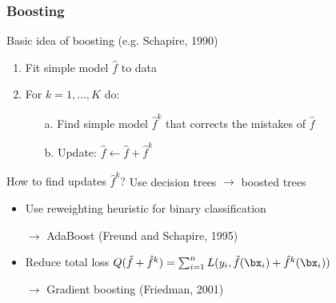\begin{frame}
	\frametitle{Boosting}
	\begin{block}{Basic idea of boosting (e.g. Schapire, 1990)}
		\begin{enumerate}
			\item Fit simple model $\hat f$ to data
			\item For $k = 1, \dots, K$ do:
			\begin{itemize}
				\item[a.] Find simple model $\hat f^k$ that corrects the mistakes of $\hat f$
				\item[b.] Update: $\hat f \leftarrow \hat f + \hat f^k$
			\end{itemize}
		\end{enumerate}
	\end{block}
	
	\begin{block}{How to find updates $\hat f^k$?}
		Use decision trees $\rightarrow$ \alert{boosted trees}
		\begin{itemize}
			\item Use reweighting heuristic for binary classification
			
			$\rightarrow$ AdaBoost (Freund and Schapire, 1995)
			\item Reduce total loss $Q(\hat f + \hat f^k) = \sum_{i = 1}^n L(y_i, \hat f(\bx_i) + \hat f^k (\bx_i))$ 
			
			$\rightarrow$ \alert{Gradient boosting} (Friedman, 2001)
		\end{itemize}
	\end{block}
\end{frame}

